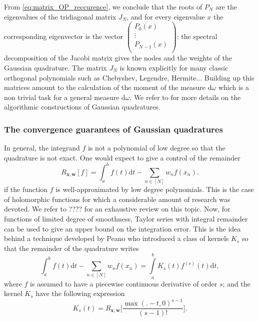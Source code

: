 \documentclass[twoside,11pt]{book}
\numberwithin{theorem}{chapter}
\numberwithin{definition}{chapter}
\numberwithin{proposition}{chapter}
\numberwithin{corollary}{chapter}
\numberwithin{example}{chapter}
\numberwithin{lemma}{chapter}
\begin{document}
From \eqref{eq:matrix_OP_reccurence}, we conclude that the roots of $P_{N}$ are the eigenvalues of the tridiagonal matrix $J_{N}$, and for every eigenvalue $x$ the corresponding eigenvector is the vector $\begin{pmatrix}
P_{0}(x)  \\
\vdots \\
P_{N-1}(x) \\
\end{pmatrix}$: the spectral decomposition of the Jacobi matrix gives the nodes and the weights of the Gaussian quadrature. The matrix $J_{N}$ is known explicitly for many classic orthogonal polynomials such as Chebyshev, Legendre, Hermite... Building up this matrices amount to the calculation of the moment of the measure $\mathrm{d}\omega$ which is a non trivial task for a general measure $\mathrm{d}\omega$. We refer to \citep{GoMe09} for more details on the algorithmic constructions of Gaussian quadratures.

\subsubsection{The convergence guarantees of Gaussian quadratures}
In general, the integrand $f$ is not a polynomial of low degree so that the quadrature is not exact. One would expect to give a control of the remainder 
\begin{equation}
R_{\bm{x},\bm{w}} [f] = \int_{a}^{b}f(t)\mathrm{d}t - \sum\limits_{n \in [N]} w_{n}f(x_{n}). 
\end{equation}
if the function $f$ is well-approximated by low degree polynomials. This is the case of holomorphic functions for which a considerable amount of research was devoted. We refer to ???? for an exhaustive review on this topic. Now, for functions of limited degree of smoothness, Taylor series with integral remainder can be used to give an upper bound on the integration error. This is the idea behind a technique developed by Peano who introduced a class of kernels $K_{s}$ so that the remainder of the quadrature writes
\begin{equation}
\int_{a}^{b}f(t)\mathrm{d}t - \sum\limits_{n \in [N]} w_{n}f(x_{n}) = \int\limits_{a}^{b}K_{s}(t)f^{(s)}(t)\mathrm{d}t,
\end{equation}
where $f$ is assumed to have a piecewise continuous derivative of order $s$; and the kernel $K_{s}$ have the following expression
\begin{equation}
K_{s}(t) = R_{\bm{x},\bm{w}} \bigg[ \frac{\max(.-t,0)^{s-1}}{(s-1)!} \bigg].
\end{equation}
\end{document}

